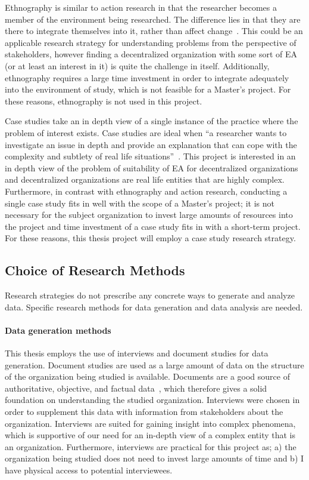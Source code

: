 Ethnography is similar to action research in that the researcher becomes a member of the environment being researched. The difference lies in that they are there to integrate themselves into it, rather than affect change~\cite{denscombe2010good}. This could be an applicable research strategy for understanding problems from the perspective of stakeholders, however finding a decentralized organization with some sort of EA (or at least an interest in it) is quite the challenge in itself. Additionally, ethnography requires a large time investment in order to integrate adequately into the environment of study, which is not feasible for a Master's project. For these reasons, ethnography is not used in this project. 

Case studies take an in depth view of a single instance of the practice where the problem of interest exists. Case studies are ideal when ``a researcher wants to investigate an issue in depth and provide an explanation that can cope with the complexity and subtlety of real life situations''~\cite{denscombe2010good}. This project is interested in an in depth view of the problem of suitability of EA for decentralized organizations and decentralized organizations are real life entities that are highly complex. Furthermore, in contrast with ethnography and action research, conducting a single case study fits in well with the scope of a Master's project; it is not necessary for the subject organization to invest large amounts of resources into the project and time investment of a case study fits in with a short-term project. For these reasons, this thesis project will employ a case study research strategy.  

\subsection{Choice of Research Methods}

Research strategies do not prescribe any concrete ways to generate and analyze data. Specific research methods for data generation and data analysis are needed. 


\paragraph*{Data generation methods}

This thesis employs the use of interviews and document studies for data generation.  Document studies are used as a large amount of data on the structure of the organization being studied is available. Documents are a good source of authoritative, objective, and factual data~\cite{denscombe2010good}, which therefore gives a solid foundation on understanding the studied organization. Interviews were chosen in order to supplement this data with information from stakeholders about the organization. Interviews are suited for gaining insight into complex phenomena, which is supportive of our need for an in-depth view of a complex entity that is an organization. Furthermore, interviews are practical for this project as; a) the organization being studied does not need to invest large amounts of time and b) I have physical access to potential interviewees. 

